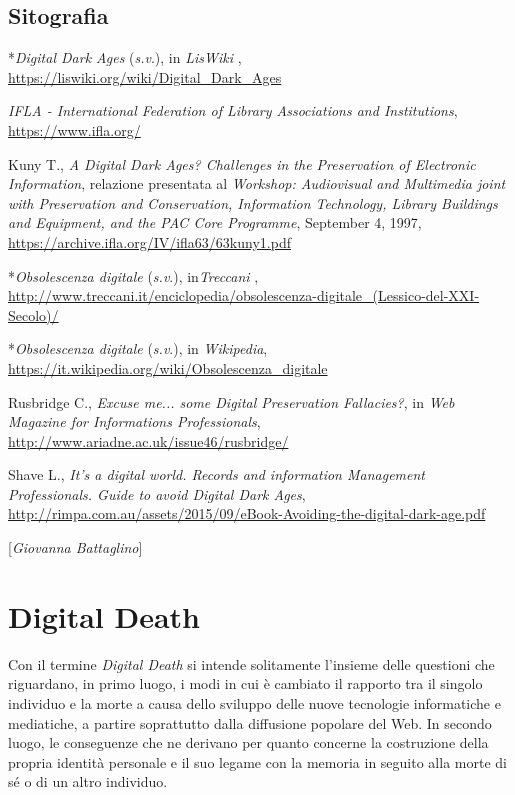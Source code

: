 \section*{Sitografia}
{\parindent0pt 
*\emph{Digital Dark Ages} (\emph{s.v}.), in \emph{LisWiki} ,
\url{https://liswiki.org/wiki/Digital_Dark_Ages}

\emph{IFLA - International Federation of Library Associations and
Institutions},
\url{https://www.ifla.org/}

Kuny T., \emph{A Digital Dark Ages? Challenges in the Preservation of
Electronic Information}, relazione presentata al \emph{Workshop:
Audiovisual and Multimedia joint with Preservation and Conservation,
Information Technology, Library Buildings and Equipment, and the PAC
Core Programme}, September 4, 1997,
\url{https://archive.ifla.org/IV/ifla63/63kuny1.pdf}

*\emph{Obsolescenza digitale} (\emph{s.v}.), in\emph{Treccani} ,
\url{http://www.treccani.it/enciclopedia/obsolescenza-digitale_(Lessico-del-XXI-Secolo)/}


*\emph{Obsolescenza digitale} (\emph{s.v}.), in \emph{Wikipedia},
\url{https://it.wikipedia.org/wiki/Obsolescenza_digitale}


Rusbridge C., \emph{Excuse me... some Digital Preservation Fallacies?},
in \emph{Web Magazine for Informations Professionals},
\url{http://www.ariadne.ac.uk/issue46/rusbridge/}

Shave L., \emph{It's a digital world. Records and information Management
Professionals. Guide to avoid Digital Dark Ages},
\url{http://rimpa.com.au/assets/2015/09/eBook-Avoiding-the-digital-dark-age.pdf}

}

\hrulefill 

{[}\emph{Giovanna Battaglino}{]}



\chapter{Digital Death}

Con il termine \emph{Digital Death} si intende solitamente l'insieme
delle questioni che riguardano, in primo luogo, i modi in cui è cambiato
il rapporto tra il singolo individuo e la morte a causa dello sviluppo
delle nuove tecnologie informatiche e mediatiche, a partire soprattutto
dalla diffusione popolare del Web. In secondo luogo, le conseguenze che
ne derivano per quanto concerne la costruzione della propria identità
personale e il suo legame con la memoria in seguito alla morte di sé o
di un altro individuo.

